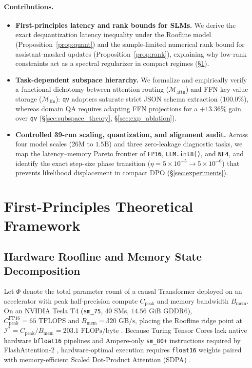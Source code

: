 \documentclass[10pt,a4paper,twocolumn]{article}
\begin{document}
\paragraph{Contributions.}
\begin{itemize}\setlength{\itemsep}{1.5pt}\setlength{\parskip}{0pt}\setlength{\topsep}{3pt}
  \item \textbf{First-principles latency and rank bounds for SLMs.} We derive the exact dequantization latency inequality under the Roofline model (Proposition~\ref{prop:quant}) and the sample-limited numerical rank bound for assistant-masked updates (Proposition~\ref{prop:rank}), explaining why low-rank constraints act as a spectral regularizer in compact regimes (§\ref{sec:theory}).
  \item \textbf{Task-dependent subspace hierarchy.} We formalize and empirically verify a functional dichotomy between attention routing ($\mathcal{M}_{\text{attn}}$) and FFN key-value storage ($\mathcal{M}_{\text{ffn}}$): \texttt{qv} adapters saturate strict JSON schema extraction ($100.0\%$), whereas domain QA requires adapting FFN projections for a $+13.36\%$ gain over \texttt{qv} (§\ref{sec:subspace_theory}, §\ref{sec:exp_ablation}).
  \item \textbf{Controlled 39-run scaling, quantization, and alignment audit.} Across four model scales ($26\text{M}$ to $1.5\text{B}$) and three zero-leakage diagnostic tasks, we map the latency--memory Pareto frontier of \texttt{FP16}, \texttt{LLM.int8()}, and \texttt{NF4}, and identify the exact step-size phase transition ($\eta = 5\times 10^{-5} \to 5\times 10^{-6}$) that prevents likelihood displacement in compact DPO (§\ref{sec:experiments}).
\end{itemize}

\section{First-Principles Theoretical Framework}
\label{sec:theory}

\subsection{Hardware Roofline and Memory State Decomposition}
\label{sec:roofline}

Let $\Phi$ denote the total parameter count of a causal Transformer deployed on an accelerator with peak half-precision compute $C_{\text{peak}}$ and memory bandwidth $B_{\text{mem}}$. On an NVIDIA Tesla T4 (\texttt{sm\_75}, 40 SMs, $14.56\text{ GiB}$ GDDR6), $C_{\text{peak}}^{\text{FP16}} = 65\text{ TFLOPS}$ and $B_{\text{mem}} = 320\text{ GB/s}$, placing the Roofline ridge point at $\mathcal{I}^* = C_{\text{peak}} / B_{\text{mem}} = 203.1\text{ FLOPs/byte}$ \citep{williams2009roofline}. Because Turing Tensor Cores lack native hardware \texttt{bfloat16} pipelines and Ampere-only \texttt{sm\_80+} instructions required by FlashAttention-2 \citep{dao2023flashattention2}, hardware-optimal execution requires \texttt{float16} weights paired with memory-efficient Scaled Dot-Product Attention (SDPA) \citep{rabe2021self}.
\end{document}
